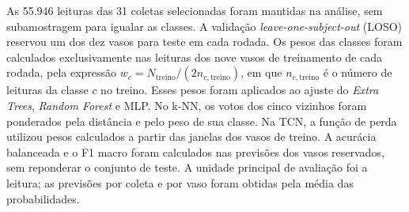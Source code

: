 As 55.946 leituras das 31 coletas selecionadas foram mantidas na análise, sem subamostragem para igualar as classes. A validação \textit{leave-one-subject-out} (LOSO) reservou um dos dez vasos para teste em cada rodada. Os pesos das classes foram calculados exclusivamente nas leituras dos nove vasos de treinamento de cada rodada, pela expressão $w_c=N_{\mathrm{treino}}/(2n_{c,\mathrm{treino}})$, em que $n_{c,\mathrm{treino}}$ é o número de leituras da classe $c$ no treino. Esses pesos foram aplicados ao ajuste do \textit{Extra Trees}, \textit{Random Forest} e MLP. No k-NN, os votos dos cinco vizinhos foram ponderados pela distância e pelo peso de sua classe. Na TCN, a função de perda utilizou pesos calculados a partir das janelas dos vasos de treino. A acurácia balanceada e o F1 macro foram calculados nas previsões dos vasos reservados, sem reponderar o conjunto de teste. A unidade principal de avaliação foi a leitura; as previsões por coleta e por vaso foram obtidas pela média das probabilidades.
